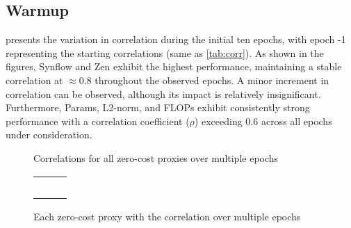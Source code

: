 \subsection{Warmup}

 presents the variation in correlation during the initial ten epochs, with epoch -1 representing the starting correlations (same as \cref{tab:corr}). As shown in the figures, \gls{Synflow} and Zen exhibit the highest performance, maintaining a stable correlation at $\approx 0.8$ throughout the observed epochs. A minor increment in correlation can be observed, although its impact is relatively insignificant. Furthermore, Params, L2-norm, and \gls{FLOPs} exhibit consistently strong performance with a correlation coefficient ($\rho$) exceeding $0.6$ across all epochs under consideration.

\begin{figure}[!ht]
  \centering
  
  \caption{Correlations for all zero-cost proxies over multiple epochs}
  \label{fig:warmup}
\end{figure}

\clearpage

\begin{figure}[htbp]
  \centering
    \begin{adjustbox}{width=1.2\columnwidth,center}
  \begin{tabular}{ccc}
     &
     &
     \\
     &
     &
     \\
     &
     &
     \\
     &
     &
     \\
     &
     
  \end{tabular}
  \end{adjustbox}
  \caption{Each zero-cost proxy with the correlation over multiple epochs}
  \label{fig:warmup_seperate}
\end{figure}
